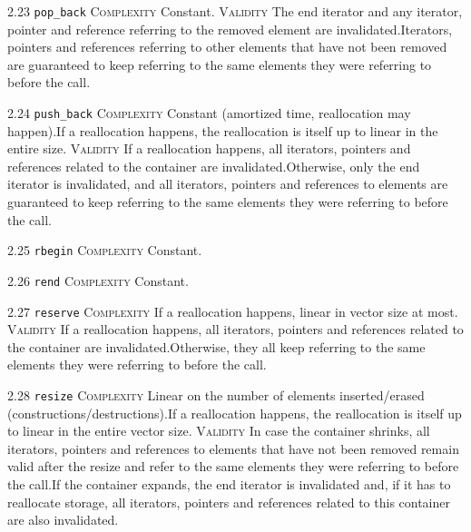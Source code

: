 \noindent\textcolor{cgreen}{2.23 \texttt{pop\_back}} \textsc{Complexity} Constant. \textsc{Validity} The end iterator and any iterator, pointer and reference referring to the removed element are invalidated.Iterators, pointers and references referring to other elements that have not been removed are guaranteed to keep referring to the same elements they were referring to before the call.\vspace{0.5em}

\noindent\textcolor{corange}{2.24 \texttt{push\_back}} \textsc{Complexity} Constant (amortized time, reallocation may happen).If a reallocation happens, the reallocation is itself up to linear in the entire size. \textsc{Validity} If a reallocation happens, all iterators, pointers and references related to the container are invalidated.Otherwise, only the end iterator is invalidated, and all iterators, pointers and references to elements are guaranteed to keep referring to the same elements they were referring to before the call.\vspace{0.5em}

\noindent\textcolor{cgreen}{2.25 \texttt{rbegin}} \textsc{Complexity} Constant. \vspace{0.5em}

\noindent\textcolor{cgreen}{2.26 \texttt{rend}} \textsc{Complexity} Constant. \vspace{0.5em}

\noindent\textcolor{corange}{2.27 \texttt{reserve}} \textsc{Complexity} If a reallocation happens, linear in vector size at most. \textsc{Validity} If a reallocation happens, all iterators, pointers and references related to the container are invalidated.Otherwise, they all keep referring to the same elements they were referring to before the call.\vspace{0.5em}

\noindent\textcolor{corange}{2.28 \texttt{resize}} \textsc{Complexity} Linear on the number of elements inserted/erased (constructions/destructions).If a reallocation happens, the reallocation is itself up to linear in the entire vector size. \textsc{Validity} In case the container shrinks, all iterators, pointers and references to elements that have not been removed remain valid after the resize and refer to the same elements they were referring to before the call.If the container expands, the end iterator is invalidated and, if it has to reallocate storage, all iterators, pointers and references related to this container are also invalidated.\vspace{0.5em}

